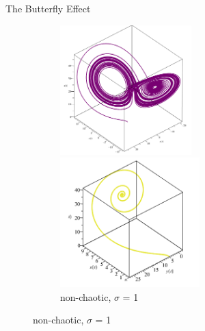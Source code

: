     \begin{frame}{The Butterfly Effect}
        \begin{figure}
            \centering
            \begin{figure}[ht]
                \begin{minipage}[b]{0.45\linewidth}
                    \centering
                    \includegraphics[width=\textwidth, height=5cm]{lorenz22.PNG}
                    \caption{chaotic, $\sigma$ = 10}
                    \label{fig:a}
                \end{minipage}
                \hspace{0.5cm}
                \begin{minipage}[b]{0.45\linewidth}
                    \centering
                    \includegraphics[width=\textwidth, height=5cm]{lorenz_s1.PNG}
                    \caption{non-chaotic, $\sigma$ = 1}
                    \label{fig:b}
                \end{minipage}
            \end{figure}
        \end{figure}
    \end{frame}    
    
 
 

